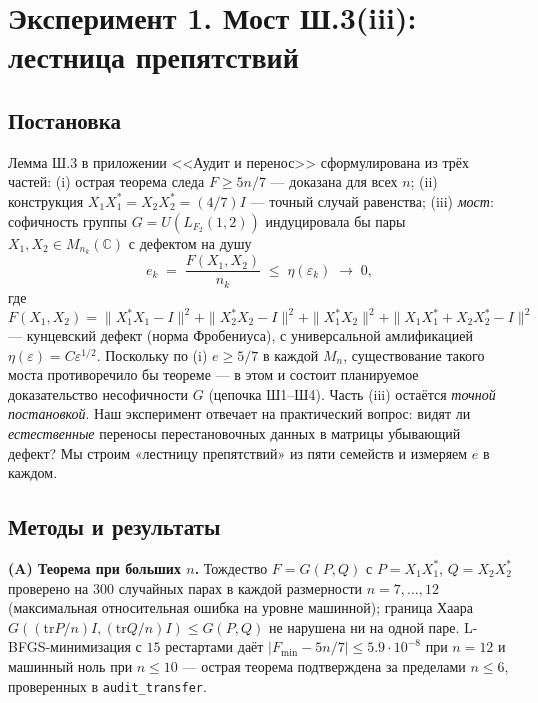 \documentclass[11pt,a4paper]{article}
\begin{document}
\section{Эксперимент 1. Мост Ш.3(iii): лестница препятствий}\label{sec:sh3}

\subsection{Постановка}

Лемма Ш.3 в приложении <<Аудит и перенос>> сформулирована из трёх частей: (i)
острая теорема следа $F \ge 5n/7$ --- доказана для всех $n$; (ii) конструкция
$X_1X_1^* = X_2X_2^* = (4/7)I$ --- точный случай равенства; (iii) \emph{мост}:
софичность группы $G = U(L_{F_2}(1,2))$ индуцировала бы пары $X_1, X_2 \in
M_{n_k}(\mathbb{C})$ с дефектом на душу
\begin{equation}\label{eq:defect}
e_k \;=\; \frac{F(X_1,X_2)}{n_k} \;\le\; \eta(\varepsilon_k) \;\to\; 0,
\end{equation}
где
\begin{equation}\label{eq:Fdef}
F(X_1,X_2) = \|X_1^*X_1 - I\|^2 + \|X_2^*X_2 - I\|^2 + \|X_1^*X_2\|^2 + \|X_1X_1^* + X_2X_2^* - I\|^2
\end{equation}
--- кунцевский дефект (норма Фробениуса),
с универсальной амлификацией $\eta(\varepsilon) = C\varepsilon^{1/2}$. Поскольку
по (i) $e \ge 5/7$ в каждой $M_n$, существование такого моста противоречило бы
теореме --- в этом и состоит планируемое доказательство несофичности $G$ (цепочка
Ш1--Ш4). Часть (iii) остаётся \emph{точной постановкой}. Наш эксперимент
отвечает на практический вопрос: видят ли \emph{естественные} переносы
перестановочных данных в матрицы убывающий дефект? Мы строим «лестницу
препятствий» из пяти семейств и измеряем $e$ в каждом.

\subsection{Методы и результаты}

\textbf{(A) Теорема при больших $n$.} Тождество $F = G(P,Q)$ с $P = X_1X_1^*$,
$Q = X_2X_2^*$ проверено на $300$ случайных парах в каждой размерности
$n = 7,\dots,12$ (максимальная относительная ошибка на уровне машинной);
граница Хаара $G((\mathrm{tr}P/n)I, (\mathrm{tr}Q/n)I) \le G(P,Q)$ не нарушена
ни на одной паре. L-BFGS-минимизация с $15$ рестартами даёт
$|F_{\min} - 5n/7| \le 5.9\cdot10^{-8}$ при $n = 12$ и машинный ноль при
$n \le 10$ --- острая теорема подтверждена за пределами $n \le 6$, проверенных
в \texttt{audit\_transfer}.
\end{document}
